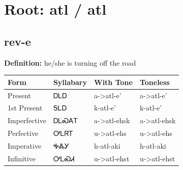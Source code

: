 \documentclass{article}%
\begin{document}
%
\normalsize%
\section*{Root: atl / atl}%
\subsection*{rev-e}%
\textbf{Definition: }%
he/she is turning off the road%
\\[0.5em]%
\begin{tabular}{|l|l|l|l|}%
\hline%
\textbf{Form}&\textbf{Syllabary}&\textbf{With Tone}&\textbf{Toneless}\\%
\hline%
Present&ᎠᏞᎠ&a{-}>atl{-}e'&a{-}>atl{-}e'\\%
1st Present&ᎦᏞᎠ&k{-}atl{-}e'&k{-}atl{-}e'\\%
Imperfective&ᎠᏞᏍᎪᎢ&a{-}>atl{-}ehsk&a{-}>atl{-}ehsk\\%
Perfective&ᎤᏞᏒᎢ&u{-}>atl{-}ehs&u{-}>atl{-}ehs\\%
Imperative&ᎭᏜᎩ&h{-}atl{-}aki&h{-}atl{-}aki\\%
Infinitive&ᎤᏞᏍᏗ&u{-}>atl{-}ehst&u{-}>atl{-}ehst\\%
\hline%
\end{tabular}%
\\[1em]%
\end{document}

